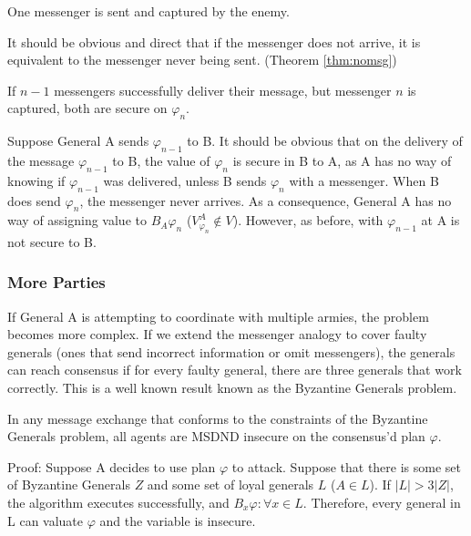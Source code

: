\begin{case}
One messenger is sent and captured by the enemy.
\end{case}

It should be obvious and direct that if the messenger does not arrive, it is equivalent to the messenger never being sent. (Theorem \ref{thm:nomsg})

\begin{case}
If $n-1$ messengers successfully deliver their message, but messenger $n$ is captured, both are secure on $\varphi_{n}$.
\end{case}

Suppose General A sends $\varphi_{n-1}$ to B. It should be obvious that on the delivery of the message $\varphi_{n-1}$ to B, the value of $\varphi_{n}$ is secure in B to A, as A has no way of knowing if $\varphi_{n-1}$ was delivered, unless B sends $\varphi_{n}$ with a messenger. When B does send $\varphi_{n}$, the messenger never arrives. As a consequence, General A has no way of assigning value to $B_A \varphi_n$ ($V_{\varphi_n}^A \not \in V$). However, as before, with $\varphi_{n-1}$ at A is not secure to B.



\subsubsection{More Parties}

If General A is attempting to coordinate with multiple armies, the problem becomes more complex. If we extend the messenger analogy to cover faulty generals (ones that send incorrect information or omit messengers), the generals can reach consensus if for every faulty general, there are three generals that work correctly. This is a well known result known as the Byzantine Generals problem.

\begin{thm}
In any message exchange that conforms to the constraints of the Byzantine Generals problem, all agents are MSDND insecure on the consensus'd plan $\varphi$.
\end{thm}

Proof: Suppose A decides to use plan $\varphi$ to attack. Suppose that there is some set of Byzantine Generals $Z$ and some set of loyal generals $L$ ($A \in L$). If $|L| > 3|Z|$, the algorithm executes successfully, and $B_x \varphi : \forall x \in L $. Therefore, every general in L can valuate $\varphi$ and the variable is insecure.

